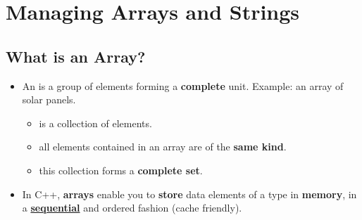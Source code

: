 \documentclass[10pt]{article}
\newcommand{\vocab}[1]{\fbox{\textbf{\textit{#1}}}}
\newcommand{\newbp}{%
  \newpage
  \mbox{}
  \newpage
}
\begin{document}
\newbp
\section{Managing Arrays and Strings}
\subsection{What is an Array?}
\begin{itemize}
	\item An \vocab{array} is a group of elements forming a \textbf{complete} unit. Example: an array of solar panels.

	\begin{itemize}
		\item is a collection of elements.
		\item all elements contained in an array are of the \textbf{same kind}.
		\item this collection forms a \textbf{complete set}.
	\end{itemize}

\item In C++, \textbf{arrays} enable you to \textbf{store} data elements of a type in \textbf{memory}, in a \underline{\textbf{sequential}} and ordered fashion (cache friendly).
\end{itemize}

\newpage
\end{document}
